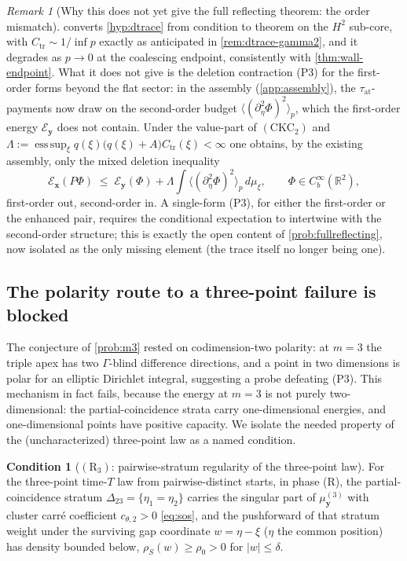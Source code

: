 \documentclass[reqno,final,11pt]{amsart}
\theoremstyle{plain}
\theoremstyle{definition}
\newtheorem{hypothesis}[theorem]{Condition}
\theoremstyle{remark}
\newtheorem{remark}[theorem]{Remark}
\newcommand{\R}{\mathbb R}
\newcommand{\cE}{\mathcal E}
\newcommand{\CKC}{(\mathrm{CKC}_{2})}
\begin{document}
\begin{remark}[Why this does not yet give the full reflecting theorem: the order mismatch]\label{rem:order-mismatch}
 converts \cref{hyp:dtrace} from condition to theorem
on the $H^2$ sub-core, with $C_{\mathrm{tr}}\sim1/\inf p$ exactly as
anticipated in \cref{rem:dtrace-gamma2}, and it degrades as $p\to0$ at the
coalescing endpoint, consistently with \cref{thm:wall-endpoint}. What it does
not give is the deletion contraction \textnormal{(P3)} for the
first-order forms beyond the flat sector: in the assembly
(\cref{app:assembly}), the $\tau_{\mathrm{at}}$-payments now draw on the
second-order budget $\langle(\partial_\eta^2\Phi)^2\rangle_p$, which the
first-order energy $\cE_{\mathbf y}$ does not contain. Under the value-part of
$\CKC$ and $\Lambda:=\operatorname*{ess\,sup}_\xi
q(\xi)\bigl(q(\xi)+A\bigr)C_{\mathrm{tr}}(\xi)<\infty$ one obtains, by the
existing assembly, only the mixed deletion inequality
\[
  \cE_{\mathbf x}(P\Phi)\;\le\;\cE_{\mathbf y}(\Phi)
  +\Lambda\!\int\!\bigl\langle(\partial_\eta^2\Phi)^2\bigr\rangle_p\,d\mu_\xi ,
  \qquad\Phi\in C_b^\infty(\R^2),
\]
first-order out, second-order in. A single-form \textnormal{(P3)}, for either
the first-order or the enhanced pair, requires the conditional expectation to
intertwine with the second-order structure; this is exactly the open content
of \cref{prob:fullreflecting}, now isolated as the only missing
element (the trace itself no longer being one).
\end{remark}

\subsection{The polarity route to a three-point failure is blocked}

The conjecture of \cref{prob:m3} rested on codimension-two polarity: at $m=3$
the triple apex has two $\Gamma$-blind difference directions, and a point in
two dimensions is polar for an elliptic Dirichlet integral, suggesting a probe
defeating \textnormal{(P3)}. This mechanism in fact fails, because the energy at
$m=3$ is not purely two-dimensional: the partial-coincidence strata carry
one-dimensional energies, and one-dimensional points have positive
capacity. We isolate the needed property of the (uncharacterized) three-point
law as a named condition.

\begin{hypothesis}[$(\mathrm R_3)$: pairwise-stratum regularity of the
three-point law]\label{hyp:r3}
For the three-point time-$T$ law from pairwise-distinct starts, in phase
\textnormal{(R)}, the partial-coincidence stratum
$\Delta_{23}=\{\eta_1=\eta_2\}$ carries the singular part of
$\mu^{(3)}_{\mathbf y}$ with cluster carr\'e coefficient $c_{\theta,2}>0$
\eqref{eq:sos}, and the pushforward of that stratum weight under the surviving
gap coordinate $w=\eta-\xi$ ($\eta$ the common position) has density bounded
below, $\rho_S(w)\ge\rho_0>0$ for $|w|\le\delta$.
\end{hypothesis}
\end{document}
